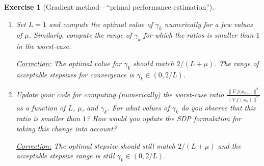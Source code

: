 \documentclass[11pt,a4paper]{article}
\newcommand{\correction}[1]{{{\color{blue}\underline{Correction:} #1}}}
\newcommand{\correction}[1]{}
\newtheorem{exercise}{Exercise}
\begin{document}
\begin{exercise}[Gradient method---``primal performance estimation'']
\begin{enumerate}
	\correction{See notebooks.}
	
	\item Set $L=1$ and compute the optimal value of $\gamma_k$ numerically for a few values of $\mu$. Similarly, compute the range of $\gamma_k$ for which the ratios is smaller than $1$ in the worst-case.
	
	\correction{The optimal value for $\gamma_k$ should match $2/(L+\mu)$. The range of acceptable stepsizes for convergence is $\gamma_k\in(0,2/L)$.}
	
	\item Update your code for computing (numerically) the worst-case ratio $\frac{\|\nabla f(x_{k+1}\|^2}{\|\nabla f(x_k)\|^2}$ as a function of $L$, $\mu$, and $\gamma_k$. For what values of $\gamma_k$ do you observe that this ratio is smaller than $1$?  How would you update the SDP formulation for taking this change into account?
	
	\correction{The optimal stepsize should still match $2/(L+\mu)$ and the acceptable stepsize range is still $\gamma_k\in(0,2/L)$.
	
}
\end{enumerate}
\end{exercise}
\end{document}
